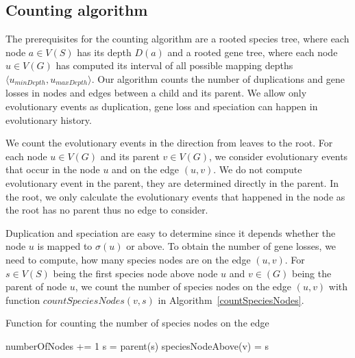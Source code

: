
\subsection{Counting algorithm}

The prerequisites for the counting algorithm are a rooted species tree, where each node $a \in V(S)$ has its depth $D(a)$ and a rooted gene tree, where each node $u \in V(G)$ has computed its interval of all possible mapping depths $\langle u_{minDepth}, u_{maxDepth}\rangle$. Our algorithm counts the number of duplications and gene losses in nodes and edges between a child and its parent. We allow only evolutionary events as duplication, gene loss and speciation can happen in evolutionary history.

We count the evolutionary events in the direction from leaves to the root. For each node $u \in V(G)$ and its parent $v \in V(G)$, we consider evolutionary events that occur in the node $u$ and on the edge $(u, v)$. We do not compute evolutionary event in the parent, they are determined directly in the parent. In the root, we only calculate the evolutionary events that happened in the node as the root has no parent thus no edge to consider.

Duplication and speciation are easy to determine since it depends whether the node $u$ is mapped to $\sigma(u)$ or above. To obtain the number of gene losses, we need to compute, how many species nodes are on the edge $(u, v)$. For $s \in V(S)$ being the first species node above node $u$ and $v \in (G)$ being the parent of node $u$, we count the number of species nodes on the edge $(u, v)$ with function $countSpeciesNodes(v, s)$ in Algorithm~\ref{countSpeciesNodes}.

\begin{algorithm}
\caption{Function for counting the number of species nodes on the edge} 
\label{countSpeciesNodes}
\begin{algorithmic}[1]
		\State numberOfNodes += 1
		\State s = parent(s)
	\EndWhile
	\State speciesNodeAbove(v) = s \\
\EndFunction
\end{algorithmic}
\end{algorithm}

